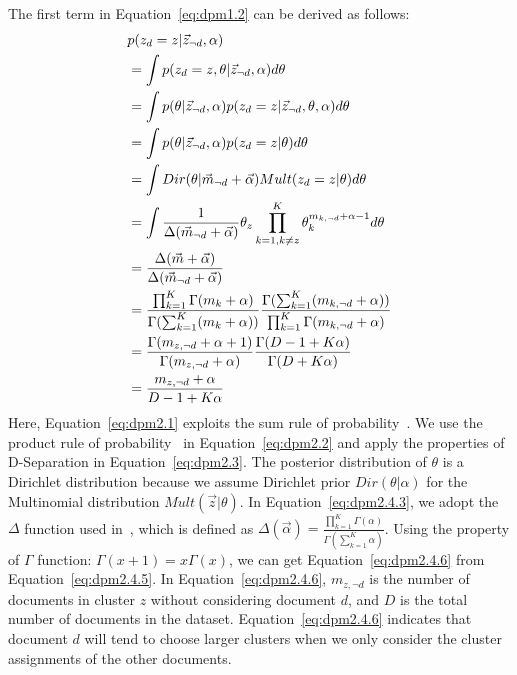 The first term in Equation~\eqref{eq:dpm1.2} can be derived as follows:
\begin{align}
    & \notag
    p(z_d=z | \vec{z}_{\neg{d}}, \alpha)\\
    & \label{eq:dpm2.1}
    = \int{p(z_d=z, \theta | \vec{z}_{\neg{d}}, \alpha)
           d\theta}\\
    & \label{eq:dpm2.2}
    = \int{p(\theta | \vec{z}_{\neg{d}}, \alpha)
           p(z_d=z | \vec{z}_{\neg{d}}, \theta, \alpha)
           d\theta}\\
    & \label{eq:dpm2.3}
    = \int{p(\theta | \vec{z}_{\neg{d}}, \alpha)
           p(z_d=z | \theta)
           d\theta}\\
    &\label{eq:dpm2.4.1}
    = \int{Dir(\theta | \vec{m}_{\neg{d}} + \vec{\alpha})
           Mult(z_d=z | \theta)
           d\theta}\\
    &\label{eq:dpm2.4.2}
    = \int{ \frac{1}{\Delta(\vec{m}_{\neg{d}}+\vec{\alpha})}
        \theta_z \prod_{k=1,k\neq z}^K \theta_k^{m_{k,\neg{d}}+\alpha-1}
         d\theta}\\
    &\label{eq:dpm2.4.3}
    = \frac{\Delta(\vec{m} + \vec{\alpha})}
           {\Delta(\vec{m}_{\neg{d}} + \vec{\alpha})}\\
    &\label{eq:dpm2.4.4}
    = \frac{\prod_{k=1}^K \Gamma(m_k + \alpha)}
            {\Gamma(\sum_{k=1}^K (m_k + \alpha))}
      \frac{\Gamma(\sum_{k=1}^K (m_{k,\neg{d}} + \alpha))}
            {\prod_{k=1}^K \Gamma(m_{k,\neg{d}} + \alpha)} \\
    &\label{eq:dpm2.4.5}
    = \frac{\Gamma(m_{z,\neg{d}} + \alpha + 1)}
            {\Gamma(m_{z,\neg{d}} + \alpha)}
      \frac{\Gamma(D - 1 + K\alpha)}
            {\Gamma(D + K\alpha)} \\
    &\label{eq:dpm2.4.6}
    = \frac{m_{z,{\neg{d}}} + \alpha}
           {D - 1 + K\alpha}
\end{align}
Here, Equation~\eqref{eq:dpm2.1} exploits the sum rule of probability~\cite{bishop2006pattern}. We use the product rule of probability~\cite{bishop2006pattern} in Equation~\eqref{eq:dpm2.2} and apply the properties of D-Separation in Equation~\eqref{eq:dpm2.3}. The posterior distribution of $\theta$ is a Dirichlet distribution because we assume Dirichlet prior $Dir(\theta | \alpha)$ for the Multinomial distribution $Mult(\vec{z} | \theta)$. In Equation~\eqref{eq:dpm2.4.3}, we adopt the $\Delta$ function used in~\cite{Hei09}, which is defined as $\Delta(\vec{\alpha}) = \frac{\prod_{k=1}^K \Gamma(\alpha)}{\Gamma(\sum_{k=1}^K \alpha)}$. Using the property of $\Gamma$ function: $\Gamma(x+1)=x\Gamma(x)$, we can get Equation~\eqref{eq:dpm2.4.6} from Equation~\eqref{eq:dpm2.4.5}. In Equation~\eqref{eq:dpm2.4.6}, $m_{z,{\neg{d}}}$ is the number of documents in cluster $z$ without considering document $d$, and $D$ is the total number of documents in the dataset. Equation~\eqref{eq:dpm2.4.6} indicates that document $d$ will tend to choose larger clusters when we only consider the cluster assignments of the other documents.

